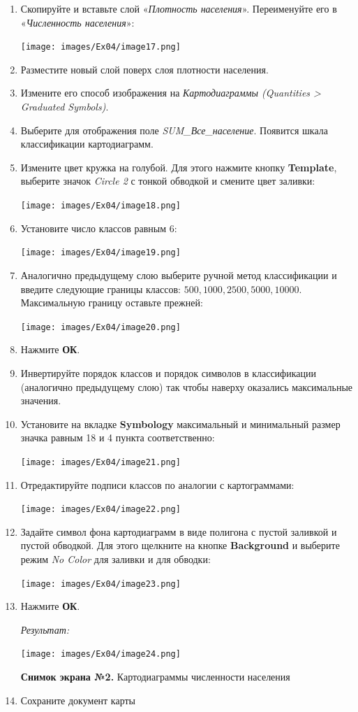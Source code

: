 \documentclass[12pt,]{book}
\begin{document}
\begin{enumerate}
\def\labelenumi{\arabic{enumi}.}
\setcounter{enumi}{1}
\item
  Скопируйте и вставьте слой «\emph{Плотность населения}». Переименуйте его в «\emph{Численность населения}»:

  \texttt{[image: images/Ex04/image17.png]}
\item
  Разместите новый слой поверх слоя плотности населения.
\item
  Измените его способ изображения на \emph{Картодиаграммы (Quantities \textgreater{} Graduated Symbols)}.
\item
  Выберите для отображения поле \emph{SUM\_Все\_население}. Появится шкала классификации картодиаграмм.
\item
  Измените цвет кружка на голубой. Для этого нажмите кнопку \textbf{Template}, выберите значок \emph{Circle 2} с тонкой обводкой и смените цвет заливки:

  \texttt{[image: images/Ex04/image18.png]}
\item
  Установите число классов равным 6:

  \texttt{[image: images/Ex04/image19.png]}
\item
  Аналогично предыдущему слою выберите ручной метод классификации и введите следующие границы классов: \(500, 1000, 2500, 5000, 10000\). Максимальную границу оставьте прежней:

  \texttt{[image: images/Ex04/image20.png]}
\item
  Нажмите \textbf{ОК}.
\item
  Инвертируйте порядок классов и порядок символов в классификации (аналогично предыдущему слою) так чтобы наверху оказались максимальные значения.
\item
  Установите на вкладке \textbf{Symbology} максимальный и минимальный размер значка равным 18 и 4 пункта соответственно:

  \texttt{[image: images/Ex04/image21.png]}
\item
  Отредактируйте подписи классов по аналогии с картограммами:

  \texttt{[image: images/Ex04/image22.png]}
\item
  Задайте символ фона картодиаграмм в виде полигона с пустой заливкой и пустой обводкой. Для этого щелкните на кнопке \textbf{Background} и выберите режим \emph{No Color} для заливки и для обводки:

  \texttt{[image: images/Ex04/image23.png]}
\item
  Нажмите \textbf{ОК}.

  \emph{Результат:}

  \texttt{[image: images/Ex04/image24.png]}

  \textbf{Снимок экрана №2.} Картодиаграммы численности населения
\item
  Сохраните документ карты
\end{enumerate}
\end{document}
